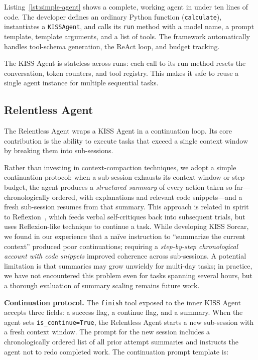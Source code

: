 \documentclass{article}
\begin{document}
Listing~\ref{lst:simple-agent} shows a complete, working agent in under ten lines of code.  The developer defines an ordinary Python function (\texttt{calculate}), instantiates a \texttt{KISSAgent}, and calls its \texttt{run} method with a model name, a prompt template, template arguments, and a list of tools.  The framework automatically handles tool-schema generation, the ReAct loop, and budget tracking.

The KISS Agent is stateless across runs: each call to its run method resets the conversation, token counters, and tool registry.  This makes it safe to reuse a single agent instance for multiple sequential tasks.

\subsection{Relentless Agent}
\label{sec:relentless-agent}

The Relentless Agent wraps a KISS Agent in a continuation loop.  Its core contribution is the ability to execute tasks that exceed a single context window by breaking them into sub-sessions.

Rather than investing in context-compaction techniques, we adopt a simple continuation protocol: when a sub-session exhausts its context window or step budget, the agent produces a \emph{structured summary} of every action taken so far---chronologically ordered, with explanations and relevant code snippets---and a fresh sub-session resumes from that summary.  This approach is related in spirit to Reflexion~\citep{shinn2023reflexion}, which feeds verbal self-critiques back into subsequent trials, but uses Reflexion-like technique to continue a task.  While developing KISS Sorcar, we found in our experience that a na\"ive instruction to ``summarize the current context'' produced poor continuations; requiring a \emph{step-by-step chronological account with code snippets} improved coherence across sub-sessions. A potential limitation is that summaries may grow unwieldy for multi-day tasks; in practice, we have not encountered this problem even for tasks spanning several hours, but a thorough evaluation of summary scaling remains future work.

\textbf{Continuation protocol.}  The \texttt{finish} tool exposed to the inner KISS Agent accepts three fields: a success flag, a continue flag, and a summary.  When the agent sets \texttt{is\_continue=True}, the Relentless Agent starts a new sub-session with a fresh context window.  The prompt for the new session includes a chronologically ordered list of all prior attempt summaries and instructs the agent not to redo completed work.  The continuation prompt template is:
\end{document}
